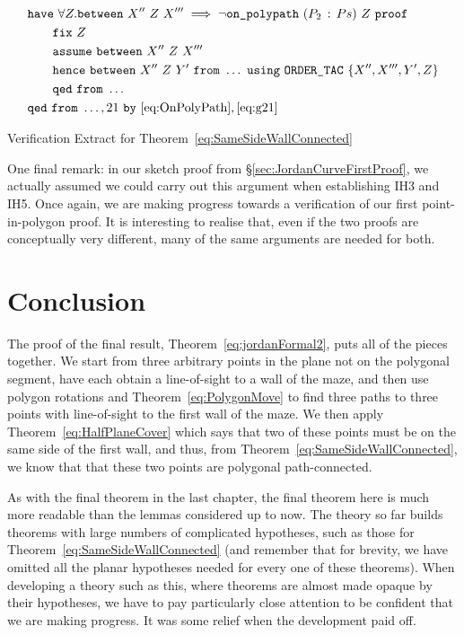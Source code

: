 \begin{boxedfigure}
\begin{align*}
  &\code{have}\ \forall Z. \between{X''}{Z}{X'''} \implies \neg\code{on\_polypath}\ (\cons{P_2}{Ps})\ Z\ \code{proof}\\
  &\qquad \code{fix}\ Z\\
  &\qquad \code{assume}\ \between{X''}{Z}{X'''}\\
  &\qquad \code{hence}\ \between{X''}{Z}{Y'}\ \code{from}\ \ldots\ \code{using}\ \code{ORDER\_TAC}\ \{X'',X''',Y',Z\}\\
  &\qquad \code{qed}\ \code{from}\ \ldots\\
  &\code{qed}\ \code{from}\ \ldots,21\ \code{by}\ \eqref{eq:OnPolyPath},\eqref{eq:g21}
\end{align*}
\caption{Verification Extract for Theorem~\ref{eq:SameSideWallConnected}}
\label{fig:SameSideWallConnectedExtract}
\end{boxedfigure}

One final remark: in our sketch proof from \S\ref{sec:JordanCurveFirstProof}, we actually assumed we could carry out this argument when establishing IH3 and IH5. Once again, we are making progress towards a verification of our first point-in-polygon proof. It is interesting to realise that, even if the two proofs are conceptually very different, many of the same arguments are needed for both.

\section{Conclusion}
The proof of the final result, Theorem~\ref{eq:jordanFormal2}, puts all of the pieces together. We start from three arbitrary points in the plane not on the polygonal segment, have each obtain a line-of-sight to a wall of the maze, and then use polygon rotations and Theorem~\ref{eq:PolygonMove} to find three paths to three points with line-of-sight to the first wall of the maze. We then apply  Theorem~\ref{eq:HalfPlaneCover} which says that two of these points must be on the same side of the first wall, and thus, from Theorem~\ref{eq:SameSideWallConnected}, we know that that these two points are polygonal path-connected.

As with the final theorem in the last chapter, the final theorem here is much more readable than the lemmas considered up to now. The theory so far builds theorems with large numbers of complicated hypotheses, such as those for Theorem~\ref{eq:SameSideWallConnected} (and remember that for brevity, we have omitted all the planar hypotheses needed for every one of these theorems). When developing a theory such as this, where theorems are almost made opaque by their hypotheses, we have to pay particularly close attention to be confident that we are making progress. It was some relief when the development paid off.

